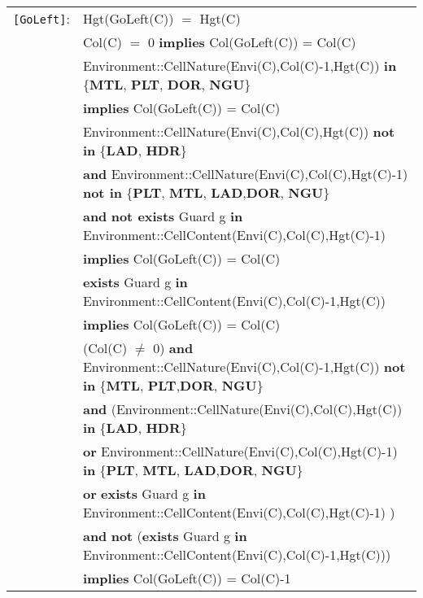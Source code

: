 \documentclass[7pt]{article}
\begin{document}
\begin{tabular}{rl}


\texttt{[GoLeft]}: & \textrm{Hgt(GoLeft(C))} $=$ \textrm{Hgt(C)} \\
& \textrm{Col(C)} $=$ 0 \textbf{implies} \textrm{Col(GoLeft(C))} = \textrm{Col(C)} \\
& \textrm{Environment::CellNature(Envi(C),Col(C)-1,Hgt(C))} \textbf{in} \{\textbf{MTL}, \textbf{PLT}, \textbf{DOR}, \textbf{NGU}\} \\
& \quad \textbf{implies} \textrm{Col(GoLeft(C))} = \textrm{Col(C)} \\
& \textrm{Environment::CellNature(Envi(C),Col(C),Hgt(C))} \textbf{not in} \{\textbf{LAD}, \textbf{HDR}\}
\\ & \quad\quad \textbf{and} \textrm{Environment::CellNature(Envi(C),Col(C),Hgt(C)-1)} \textbf{not in} \{\textbf{PLT}, \textbf{MTL}, \textbf{LAD},\textbf{DOR}, \textbf{NGU}\} \\
& \quad\quad \textbf{and} \textbf{not exists} \textrm{Guard} g \textbf{in} \textrm{Environment::CellContent(Envi(C),Col(C),Hgt(C)-1)} \\
& \quad\quad \textbf{implies} \textrm{Col(GoLeft(C))} = \textrm{Col(C)} \\
& \textbf{exists} \textrm{Guard} g \textbf{in} \textrm{Environment::CellContent(Envi(C),Col(C)-1,Hgt(C))} \\ & \quad\quad \textbf{implies} \textrm{Col(GoLeft(C))} = \textrm{Col(C)} \\
& (\textrm{Col(C)} $\neq$ 0) \textbf{and} \textrm{Environment::CellNature(Envi(C),Col(C)-1,Hgt(C))} \textbf{not in} \{\textbf{MTL}, \textbf{PLT},\textbf{DOR}, \textbf{NGU}\} \\
& \quad\quad \textbf{and} (\textrm{Environment::CellNature(Envi(C),Col(C),Hgt(C))} \textbf{in} \{\textbf{LAD}, \textbf{HDR}\} \\
& \quad\quad\quad\quad \textbf{or} \textrm{Environment::CellNature(Envi(C),Col(C),Hgt(C)-1)} \textbf{in} \{\textbf{PLT}, \textbf{MTL}, \textbf{LAD},\textbf{DOR}, \textbf{NGU}\} \\
& \quad\quad\quad\quad \textbf{or} \textbf{exists} \textrm{Guard} g \textbf{in} \textrm{Environment::CellContent(Envi(C),Col(C),Hgt(C)-1)} ) \\
& \quad\quad \textbf{and} \textbf{not} (\textbf{exists} \textrm{Guard} g \textbf{in} \textrm{Environment::CellContent(Envi(C),Col(C)-1,Hgt(C))}) \\
& \quad\quad \textbf{implies} \textrm{Col(GoLeft(C))} = \textrm{Col(C)}-1 \\


\end{tabular}
\end{document}
